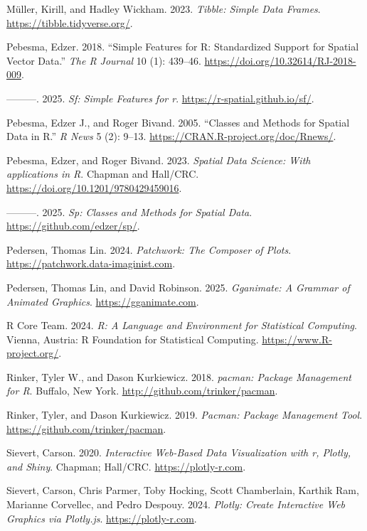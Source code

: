 \documentclass[
]{article}
\newlength{\cslhangindent}
\newenvironment{CSLReferences}[2] %
 {\begin{list}{}{%
  \setlength{\itemindent}{0pt}
  \setlength{\leftmargin}{0pt}
  \setlength{\parsep}{0pt}
  \ifodd #1
   \setlength{\leftmargin}{\cslhangindent}
   \setlength{\itemindent}{-1\cslhangindent}
  \fi
  \setlength{\itemsep}{#2\baselineskip}}}
 {\end{list}}
\begin{document}
\begin{CSLReferences}{1}{0}
Müller, Kirill, and Hadley Wickham. 2023. \emph{Tibble: Simple Data
Frames}. \url{https://tibble.tidyverse.org/}.

Pebesma, Edzer. 2018. {``{Simple Features for R: Standardized Support
for Spatial Vector Data}.''} \emph{{The R Journal}} 10 (1): 439--46.
\url{https://doi.org/10.32614/RJ-2018-009}.

---------. 2025. \emph{Sf: Simple Features for r}.
\url{https://r-spatial.github.io/sf/}.

Pebesma, Edzer J., and Roger Bivand. 2005. {``Classes and Methods for
Spatial Data in {R}.''} \emph{R News} 5 (2): 9--13.
\url{https://CRAN.R-project.org/doc/Rnews/}.

Pebesma, Edzer, and Roger Bivand. 2023. \emph{{Spatial Data Science:
With applications in R}}. {Chapman and Hall/CRC}.
\url{https://doi.org/10.1201/9780429459016}.

---------. 2025. \emph{Sp: Classes and Methods for Spatial Data}.
\url{https://github.com/edzer/sp/}.

Pedersen, Thomas Lin. 2024. \emph{Patchwork: The Composer of Plots}.
\url{https://patchwork.data-imaginist.com}.

Pedersen, Thomas Lin, and David Robinson. 2025. \emph{Gganimate: A
Grammar of Animated Graphics}. \url{https://gganimate.com}.

R Core Team. 2024. \emph{R: A Language and Environment for Statistical
Computing}. Vienna, Austria: R Foundation for Statistical Computing.
\url{https://www.R-project.org/}.

Rinker, Tyler W., and Dason Kurkiewicz. 2018. \emph{{pacman}: {P}ackage
Management for {R}}. Buffalo, New York.
\url{http://github.com/trinker/pacman}.

Rinker, Tyler, and Dason Kurkiewicz. 2019. \emph{Pacman: Package
Management Tool}. \url{https://github.com/trinker/pacman}.

Sievert, Carson. 2020. \emph{Interactive Web-Based Data Visualization
with r, Plotly, and Shiny}. Chapman; Hall/CRC.
\url{https://plotly-r.com}.

Sievert, Carson, Chris Parmer, Toby Hocking, Scott Chamberlain, Karthik
Ram, Marianne Corvellec, and Pedro Despouy. 2024. \emph{Plotly: Create
Interactive Web Graphics via Plotly.js}. \url{https://plotly-r.com}.


\end{CSLReferences}
\end{document}
